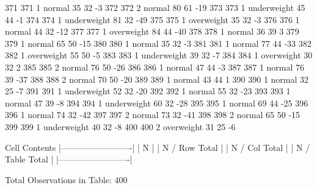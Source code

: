 \begin{Schunk}
\begin{Soutput}
		371         371   1      normal  35         32           -3
		372         372   2      normal  80         61          -19
		373         373   1 underweight  45         44           -1
		374         374   1 underweight  81         32          -49
		375         375   1  overweight  35         32           -3
		376         376   1      normal  44         32          -12
		377         377   1  overweight  84         44          -40
		378         378   1      normal  36         39            3
		379         379   1      normal  65         50          -15
		380         380   1      normal  35         32           -3
		381         381   1      normal  77         44          -33
		382         382   1  overweight  55         50           -5
		383         383   1 underweight  39         32           -7
		384         384   1  overweight  30         32            2
		385         385   2      normal  76         50          -26
		386         386   1      normal  47         44           -3
		387         387   1      normal  76         39          -37
		388         388   2      normal  70         50          -20
		389         389   1      normal  43         44            1
		390         390   1      normal  32         25           -7
		391         391   1 underweight  52         32          -20
		392         392   1      normal  55         32          -23
		393         393   1      normal  47         39           -8
		394         394   1 underweight  60         32          -28
		395         395   1      normal  69         44          -25
		396         396   1      normal  74         32          -42
		397         397   2      normal  73         32          -41
		398         398   2      normal  65         50          -15
		399         399   1 underweight  40         32           -8
		400         400   2  overweight  31         25           -6
	\end{Soutput}
	\begin{Soutput}
		Cell Contents
		|-------------------------|
		|                       N |
		|           N / Row Total |
		|           N / Col Total |
		|         N / Table Total |
		|-------------------------|


		Total Observations in Table:  400



\end{Soutput}
\end{Schunk}
